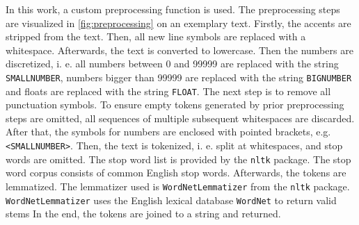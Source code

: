 In this work, a custom preprocessing function is used.
The preprocessing steps are visualized in \autoref{fig:preprocessing} on an exemplary text.
Firstly, the accents are stripped from the text.
Then, all new line symbols are replaced with a whitespace.
Afterwards, the text is converted to lowercase.
Then the numbers are discretized, i. e. all numbers between 0 and 99999 are replaced with the string \texttt{SMALLNUMBER}, 
numbers bigger than 99999 are replaced with the string \texttt{BIGNUMBER} and floats are replaced with the string \texttt{FLOAT}.
The next step is to remove all punctuation symbols.
To ensure empty tokens generated by prior preprocessing steps are omitted, 
all sequences of multiple subsequent whitespaces are discarded.
After that, the symbols for numbers are enclosed with pointed brackets, e.g. \texttt{<SMALLNUMBER>}.
Then, the text is tokenized, i. e. split at whitespaces, and stop words are omitted.
The stop word list is provided by the \texttt{nltk} package.
The stop word corpus consists of common English stop words.
Afterwards, the tokens are lemmatized.
The lemmatizer used is \texttt{WordNetLemmatizer} from the \texttt{nltk} package.
\texttt{WordNetLemmatizer} uses the English lexical database \texttt{WordNet} to return valid stems \cite{nltk-lemma-wordnet}
In the end, the tokens are joined to a string and returned.
